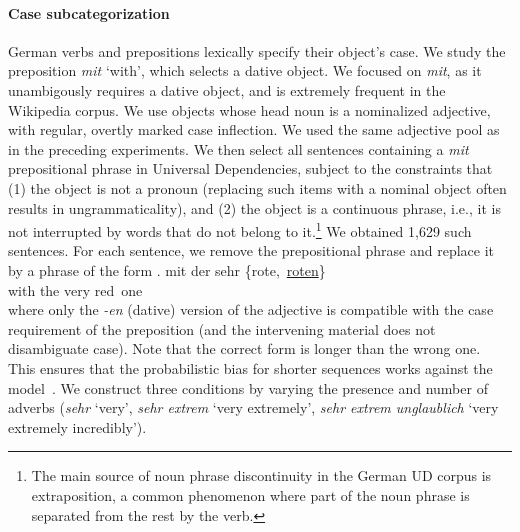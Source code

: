 \paragraph{Case subcategorization}
German verbs and prepositions lexically specify their object's case.  We
study the preposition \textit{mit} `with', which selects a dative
object. We focused on \textit{mit}, as it unambigously requires a dative object,
and is extremely frequent in the Wikipedia corpus.
We use objects whose head noun is a nominalized adjective,
with regular, overtly marked case inflection.
We used the same adjective pool as in the preceding experiments.
We then select all sentences containing a \emph{mit}
prepositional phrase in Universal Dependencies, subject to the
constraints that (1) the object is not a pronoun (replacing such items with a
nominal object often results in ungrammaticality), and (2) the object
is a continuous phrase, i.e., it is not interrupted by words that do
not belong to it.\footnote{The main source of noun phrase discontinuity
in the German UD corpus is extraposition, a common phenomenon where part of the noun phrase is
separated from the rest by the verb.} %
We obtained 1,629 such sentences.  For each sentence, we remove the
prepositional phrase and replace it by a phrase of the form
\exg. mit der sehr \{rote,\ \underline{roten}\} \\
with the very red\ one \\

where only the \emph{-en} (dative) version of the adjective is
compatible with the case requirement of the preposition (and the
intervening material does not disambiguate case). Note that the
correct form is longer than the wrong one. This ensures that the
probabilistic bias for shorter sequences works against the model~\cite{sountsov2016length}.
We
construct three conditions by varying the presence and number of
adverbs (\emph{sehr} `very', \emph{sehr extrem} `very extremely',
\emph{sehr extrem unglaublich} `very extremely incredibly').

